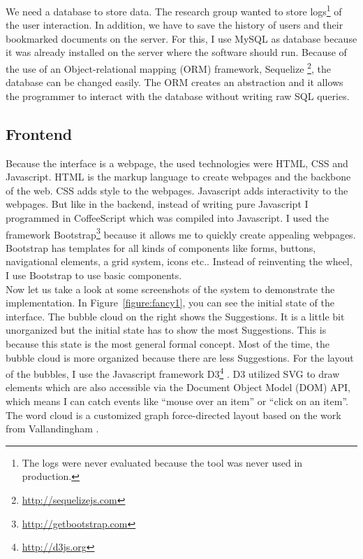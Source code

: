 \documentclass[11pt]{report}
\begin{document}
We need a database to store data. The research group wanted to store logs\footnote{The logs were never evaluated because the tool was never used in production.} of the user interaction. In addition, we have to save the history of users and their bookmarked documents on the server. For this, I use MySQL as database because it was already installed on the server where the software should run. Because of the use of an Object-relational mapping (ORM) framework, Sequelize \footnote{\url{http://sequelizejs.com}}, the database can be changed easily. The ORM creates an abstraction and it allows the programmer to interact with the database without writing raw SQL queries.

\subsection{Frontend}

Because the interface is a webpage, the used technologies were HTML, CSS and Javascript. HTML is the markup language to create webpages and the backbone of the web. CSS adds style to the webpages. Javascript adds interactivity to the webpages. But like in the backend, instead of writing pure Javascript I programmed in CoffeeScript which was compiled into Javascript. I used the framework Bootstrap\footnote{\url{http://getbootstrap.com}} because it allows me to quickly create appealing webpages. Bootstrap has templates for all kinds of components like forms, buttons, navigational elements, a grid system, icons etc.. Instead of reinventing the wheel, I use Bootstrap to use basic components.\\

Now let us take a look at some screenshots of the system to demonstrate the implementation. In Figure~\ref{figure:fancy1}, you can see the initial state of the interface. The bubble cloud on the right shows the Suggestions. It is a little bit unorganized but the initial state has to show the most Suggestions. This is because this state is the most general formal concept. Most of the time, the bubble cloud is more organized because there are less Suggestions. For the layout of the bubbles, I use the Javascript framework D3\footnote{\url{http://d3js.org}} \cite{Bostock2011}. D3 utilized SVG to draw elements which are also accessible via the Document Object Model (DOM) API, which means I can catch events like ``mouse over an item'' or ``click on an item''. The word cloud is a customized graph force-directed layout based on the work from Vallandingham \cite{Vallandingham}. \\
\end{document}
